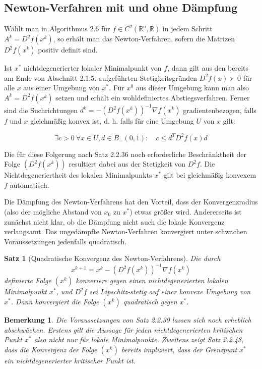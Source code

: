 \documentclass[11pt]{scrreprt}
\newcounter{thm}
\theoremstyle{thmstyle}
\numberwithin{thm}{section}
\newtheorem{bemerkung}[thm]{Bemerkung}
\newtheorem{satz}[thm]{Satz}
\begin{document}
\subsection*{Newton-Verfahren mit und ohne Dämpfung}

Wählt man in Algorithmus 2.6 für $f \in C^2(\mathbb{R}^n, \mathbb{R})$ in jedem Schritt $A^k = D^2 f(x^k)$, so erhält man das Newton-Verfahren, sofern die Matrizen $D^2 f (x^k)$ positiv definit sind. ~\bigskip

Ist $x^*$ nichtdegenerierter lokaler Minimalpunkt von $f$, dann gilt aus den bereits am Ende von Abschnitt 2.1.5. aufgeführten Stetigkeitsgründen $D^2 f(x) \succ 0$ für alle $x$ aus einer Umgebung von $x^*$.  Für $x^0$ aus dieser Umgebung  kann man also $A^k = D^2 f (x^k)$ setzen und erhält ein wohldefiniertes Abstiegsverfahren. Ferner sind die Suchrichtungen $d^k = - \left( D^2 f(x^k) \right)^{-1} \nabla f(x^k)$ gradientenbezogen, falls $f$ und $x$ gleichmäßig konvex ist, d. h. falls für eine Umgebung $U$ von $x$ gilt:

	$$ \exists c > 0 ~\forall x \in U, d\in B_{=}(0, 1): \quad c \leq d^T D^2 f(x) d $$
	
Die für diese Folgerung nach Satz 2.2.36 noch erforderliche Beschränktheit der Folge $(D^2 f (x^k ))$ resultiert dabei aus der Stetigkeit von $D^2 f$. Die Nichtdegeneriertheit des lokalen Minimalpunkts $x^*$ gilt bei gleichmäßig konvexem $f$ automatisch. ~\bigskip

Die Dämpfung des Newton-Verfahrens hat den Vorteil, dass der Konvergenzradius (also der mögliche Abstand von $x_0$ zu $x^*$) etwas größer wird. Andererseits ist zunächst nicht klar, ob die Dämpfung nicht auch die lokale Konvergenz verlangsamt. Das ungedämpfte Newton-Verfahren konvergiert unter schwachen Voraussetzungen jedenfalls quadratisch.

\begin{satz}[Quadratische Konvergenz des Newton-Verfahrens]
	Die durch
	$$ x^{k+1} = x^k - \left( D^2 f(x^k) \right)^{-1} \nabla f(x^k) $$
	definierte Folge $(x^k)$ konveriere gegen einen nichtdegenerierten lokalen Minimalpunkt $x^*$, und $D^2 f$ sei Lipschitz-stetig auf einer konvexe Umgebung von $x^*$. Dann konvergiert die Folge $(x^k)$ quadratisch gegen $x^*$.
\end{satz}

\begin{bemerkung}
	Die Voraussetzungen von Satz 2.2.39 lassen sich noch erheblich abschwächen. Erstens gilt die Aussage für jeden nichtdegenerierten kritischen Punkt $x^*$ also nicht nur für lokale Minimalpunkte. Zweitens zeigt Satz 2.2.48, dass die Konvergenz der Folge $(x^k)$ bereits impliziert, dass der Grenzpunt $x^*$ ein nichtdegenerierter kritischer Punkt ist.	
\end{bemerkung}
\end{document}
